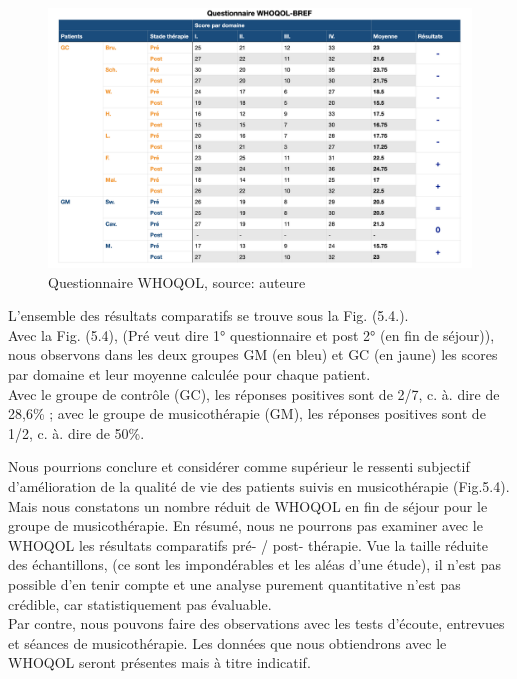   \begin{figure}
  	\centering
  	\includegraphics[width=0.7\linewidth]{images/graphiques/questionnaire_wq.png}
  	\caption[Questionnaire WHOQOL-BREF]{Questionnaire WHOQOL, source: auteure}%
  	
  \end{figure}
    L'ensemble des résultats comparatifs se trouve sous la Fig. (5.4.).
   \\
  Avec la Fig. (5.4), (Pré veut dire 1° questionnaire et post 2° (en fin de séjour)), nous observons dans les 
  deux groupes GM (en bleu) et GC (en jaune) les scores par 
 domaine et leur moyenne calculée pour chaque 
 patient. 
  \\
Avec le groupe de contrôle (GC), les réponses 
 positives sont de  2/7, c. à. dire de  28,6\% ; avec 
 le groupe de musicothérapie (GM), les réponses positives sont de 1/2, c. à. dire de 50\%.
 
 
 
 
 Nous pourrions conclure et considérer comme
  supérieur le ressenti
  subjectif d'amélioration de la qualité de vie 
  des patients suivis en musicothérapie (Fig.5.4).  Mais nous constatons un nombre réduit de WHOQOL 
  en fin de 
  séjour pour le groupe de musicothérapie. 
  En résumé, nous ne pourrons pas examiner avec  le WHOQOL %
  les résultats comparatifs  pré- / post- 
  thé\-ra\-pie. Vue la taille réduite des échantillons, (ce sont les 
  impondérables et les aléas d'une étude), il n'est pas possible d'en tenir compte et une analyse purement
  quantitative n'est pas crédible, car statistiquement pas évaluable. 
   \\
 Par contre, nous pouvons faire des observations avec les tests d'écoute, entrevues et séances de 
 musicothérapie. Les données que nous obtiendrons avec le WHOQOL seront présentes mais à titre 
 indicatif.
 \clearpage

